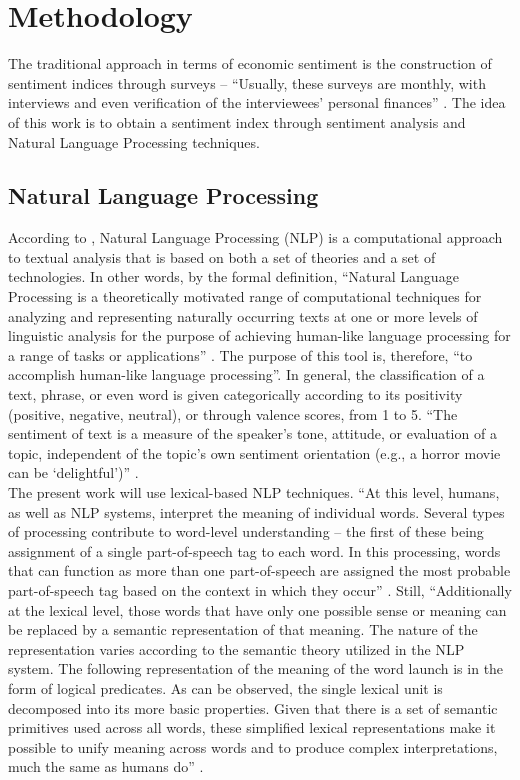 \chapter{\textbf{Methodology}} \label{cap:methodology}

The traditional approach in terms of economic sentiment is the construction of sentiment indices through surveys \cite[p.4]{shapiro2020measuring} -- ``Usually, these surveys are monthly, with interviews and even verification of the interviewees' personal finances'' \cite[p. 5]{shapiro2020measuring}. The idea of this work is to obtain a sentiment index through sentiment analysis and Natural Language Processing techniques.

\section{Natural Language Processing}

According to \cite{liddy2001natural}, Natural Language Processing (NLP) is a computational approach to textual analysis that is based on both a set of theories and a set of technologies. In other words, by the formal definition, ``Natural Language Processing is a theoretically motivated range of computational techniques for analyzing and representing naturally occurring texts at one or more levels of linguistic analysis for the purpose of achieving human-like language processing for a range of tasks or applications'' \cite[p. 2]{liddy2001natural}. The purpose of this tool is, therefore, ``to accomplish human-like language processing''. In general, the classification of a text, phrase, or even word is given categorically according to its positivity (positive, negative, neutral), or through valence scores, from 1 to 5. ``The sentiment of text is a measure of the speaker's tone, attitude, or evaluation of a topic, independent of the topic's own sentiment orientation (e.g., a horror movie can be `delightful')'' \cite[p. 5]{shapiro2020measuring}.\\

The present work will use lexical-based NLP techniques. ``At this level, humans, as well as NLP systems, interpret the meaning of individual words. Several types of processing contribute to word-level understanding – the first of these being assignment of a single part-of-speech tag to each word. In this processing, words that can function as more than one part-of-speech are assigned the most probable part-of-speech tag based on the context in which they occur'' \cite[p.7]{liddy2001natural}. Still, ``Additionally at the lexical level, those words that have only one possible sense or meaning can be replaced by a semantic representation of that meaning. The nature of the representation varies according to the semantic theory utilized in the NLP system. The following representation of the meaning of the word launch is in the form of logical predicates. As can be observed, the single lexical unit is decomposed into its more basic properties. Given that there is a set of semantic primitives used across all words, these simplified lexical representations make it possible to unify meaning across words and to produce complex interpretations, much the same as humans do'' \cite[p.7]{liddy2001natural}.\\

